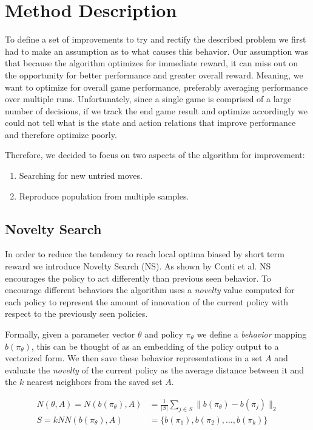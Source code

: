 \documentclass[11 pt, twocolumn]{article}
\begin{document}
\section{Method Description}
To define a set of improvements to try and rectify the described problem we first had to make an assumption as to what causes this behavior. Our assumption was that because the algorithm optimizes for immediate reward, it can miss out on the opportunity for better performance and greater overall reward. Meaning, we want to optimize for overall game performance, preferably averaging performance over multiple runs. Unfortunately, since a single game is comprised of a large number of decisions, if we track the end game result and optimize accordingly we could not tell what is the state and action relations that improve performance and therefore optimize poorly.

Therefore, we decided to focus on two aspects of the algorithm for improvement:
\begin{enumerate}
	\item Searching for new untried moves.
	\item Reproduce population from multiple samples.
\end{enumerate}

\subsection{Novelty Search}\label{sec:novelty}
In order to reduce the tendency to reach local optima biased by short term reward we introduce Novelty Search (NS). As shown by Conti et al. NS encourages the policy to act differently than previous seen behavior. To encourage different behaviors the algorithm uses a \emph{novelty} value computed for each policy to represent the amount of innovation of the current policy with respect to the previously seen policies.

Formally, given a parameter vector $\theta$  and policy $\pi_\theta$ we define a \emph{behavior} mapping $b(\pi_\theta)$, this can be thought of as an embedding of the policy output to a vectorized form. We then save these behavior representations in a set $A$ and evaluate the \emph{novelty} of the current policy as the average distance between it and the $k$ nearest neighbors from the saved set $A$.

\begin{align*}
N(\theta, A)=N(b(\pi_\theta),A)&=\frac{1}{|S|}\sum_{j\in S} \|b(\pi_\theta)-b(\pi_j)\|_2\\
S=kNN(b(\pi_\theta),A)&=\{b(\pi_1),b(\pi_2), \dots,b(\pi_k)\}
\end{align*}
\end{document}

